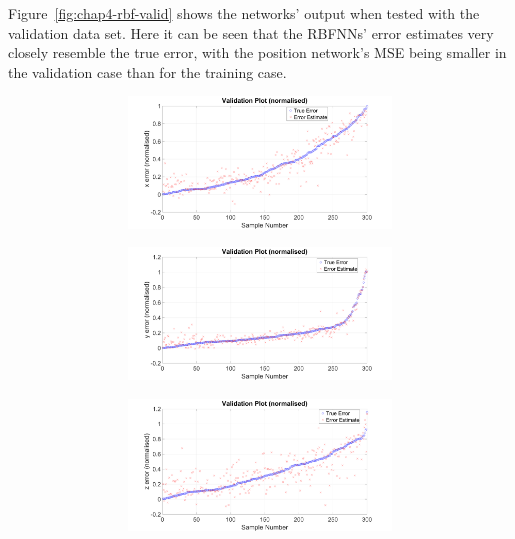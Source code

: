 Figure~\ref{fig:chap4-rbf-valid} shows the networks' output when tested with the validation data set. Here it can be seen that the RBFNNs' error estimates very closely resemble the true error, with the position network's MSE being smaller in the validation case than for the training case. 

\begin{figure}
  \begin{subfigure}{0.48\textwidth}
    \begin{subfigure}{\textwidth}
      \includegraphics[clip, trim = 80 0 100 0, width=\textwidth]{figures/chapter4/v_x}
    \end{subfigure}
    \begin{subfigure}{\textwidth}
      \includegraphics[clip, trim = 80 0 100 0, width=\textwidth]{figures/chapter4/v_y}
    \end{subfigure}
    \begin{subfigure}{\textwidth}
      \includegraphics[clip, trim = 80 0 100 0, width=\textwidth]{figures/chapter4/v_z}

\end{subfigure}
\end{subfigure}
\end{figure}
